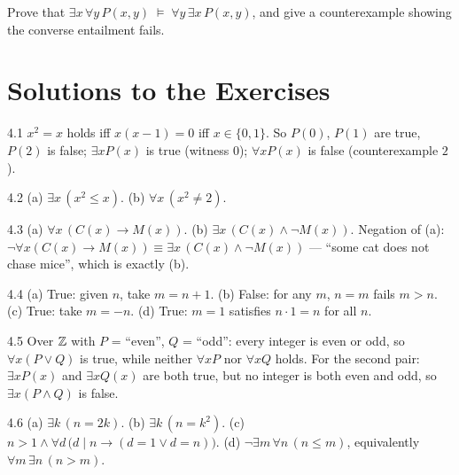 \begin{exercise}{\hard}
Prove that $\exists x\,\forall y\,P(x,y) \;\models\;
\forall y\,\exists x\,P(x,y)$, and give a counterexample showing the converse
entailment fails.
\end{exercise}

\section*{Solutions to the Exercises}

\begin{solution}{4.1}
$x^2 = x$ holds iff $x(x-1)=0$ iff $x \in \{0,1\}$. So $P(0)$, $P(1)$ are
true, $P(2)$ is false; $\exists x P(x)$ is true (witness $0$);
$\forall x P(x)$ is false (counterexample $2$).
\end{solution}

\begin{solution}{4.2}
(a) $\exists x\,(x^2 \leq x)$. (b) $\forall x\,(x^2 \neq 2)$.
\end{solution}

\begin{solution}{4.3}
(a) $\forall x\,(C(x) \to M(x))$. (b) $\exists x\,(C(x) \wedge \neg M(x))$.
Negation of (a): $\neg\forall x (C(x) \to M(x)) \equiv \exists x\,(C(x)
\wedge \neg M(x))$ --- ``some cat does not chase mice'', which is exactly (b).
\end{solution}

\begin{solution}{4.4}
(a) True: given $n$, take $m = n+1$. (b) False: for any $m$, $n = m$ fails
$m > n$. (c) True: take $m = -n$. (d) True: $m = 1$ satisfies $n \cdot 1 = n$
for all $n$.
\end{solution}

\begin{solution}{4.5}
Over $\mathbb{Z}$ with $P$ = ``even'', $Q$ = ``odd'': every integer is even or odd,
so $\forall x(P \vee Q)$ is true, while neither $\forall x P$ nor
$\forall x Q$ holds. For the second pair: $\exists x P(x)$ and
$\exists x Q(x)$ are both true, but no integer is both even and odd, so
$\exists x (P \wedge Q)$ is false.
\end{solution}

\begin{solution}{4.6}
(a) $\exists k\,(n = 2k)$.
(b) $\exists k\,(n = k^2)$.
(c) $n > 1 \wedge \forall d\,\bigl(d \mid n \to (d = 1 \vee d = n)\bigr)$.
(d) $\neg\exists m\,\forall n\,(n \leq m)$, equivalently
$\forall m\,\exists n\,(n > m)$.
\end{solution}

